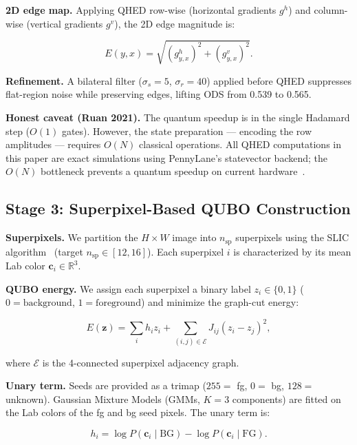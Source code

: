 \documentclass[journal]{IEEEtran}
\begin{document}
\textbf{2D edge map.}
Applying QHED row-wise (horizontal gradients $g^h$) and column-wise
(vertical gradients $g^v$), the 2D edge magnitude is:

\begin{equation}
  E(y,x) = \sqrt{\left(g^h_{y,x}\right)^2 + \left(g^v_{y,x}\right)^2}.
  \label{eq:qhed_2d}
\end{equation}

\textbf{Refinement.}
A bilateral filter ($\sigma_s=5$, $\sigma_r=40$) applied before QHED
suppresses flat-region noise while preserving edges, lifting ODS from 0.539
to 0.565.

\textbf{Honest caveat (Ruan 2021).}
The quantum speedup is in the single Hadamard step ($O(1)$ gates).  However,
the state preparation — encoding the row amplitudes — requires $O(N)$
classical operations.  All QHED computations in this paper are exact
simulations using PennyLane's statevector backend; the $O(N)$ bottleneck
prevents a quantum speedup on current hardware~\cite{ruan2021opportunities}.

\subsection{Stage 3: Superpixel-Based QUBO Construction}

\textbf{Superpixels.}
We partition the $H \times W$ image into $n_{\text{sp}}$ superpixels using
the SLIC algorithm~\cite{achanta2012slic} (target $n_{\text{sp}} \in
[12,16]$).  Each superpixel $i$ is characterized by its mean Lab color
$\mathbf{c}_i \in \mathbb{R}^3$.

\textbf{QUBO energy.}
We assign each superpixel a binary label $z_i \in \{0,1\}$
($0 = \text{background}$, $1 = \text{foreground}$) and minimize the
graph-cut energy:

\begin{equation}
  E(\mathbf{z}) = \sum_{i} h_i z_i
               + \sum_{(i,j)\in\mathcal{E}} J_{ij}(z_i - z_j)^2,
  \label{eq:qubo}
\end{equation}

where $\mathcal{E}$ is the 4-connected superpixel adjacency graph.

\textbf{Unary term.}
Seeds are provided as a trimap ($255 =$ fg, $0 =$ bg, $128 =$ unknown).
Gaussian Mixture Models (GMMs, $K=3$ components) are fitted on the Lab
colors of the fg and bg seed pixels.  The unary term is:

\begin{equation}
  h_i = \log P(\mathbf{c}_i \mid \text{BG}) - \log P(\mathbf{c}_i \mid \text{FG}).
  \label{eq:unary}
\end{equation}
\end{document}
